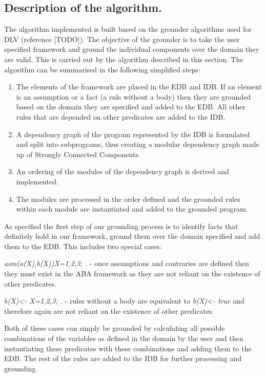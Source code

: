 \subsection{Description of the algorithm.}

The algorithm implemented is built based on the grounder algorithms used for DLV (reference [TODO]). The objective of the grounder is to take the user specified framework and ground the individual components over the domain they are valid. This is carried out by the algorithm described in this section. The algorithm can be summarised in the following simplified steps:

\begin{enumerate}
\item The elements of the framework are placed in the EDB and IDB. If an element is an assumption or a fact (a rule without a body) then they are grounded based on the domain they are specified and added to the EDB. All other rules that are depended on other predicates are added to the IDB.
\item A dependency graph of the program represented by the IDB is formulated and split into subprograms, thus creating a modular dependency graph made up of Strongly Connected Components.
\item An ordering of the modules of the dependency graph is derived and implemented.
\item The modules are processed in the order defined and the grounded rules within each module are instantiated and added to the grounded program.
\end{enumerate}

As specified the first step of our grounding process is to identify facts that definitely hold in our framework, ground them over the domain specified and add them to the EDB. This includes two special cases:

\begin{itemize*}
\item \emph{asm(a(X),b(X))\textbraceleft X=1,2,3; \textbraceright.} - once assumptions and contraries are defined then they must exist in the ABA framework as they are not reliant on the existence of other predicates.
\item \emph{b(X)\textless- \textbraceleft X=1,2,3; \textbraceright.} - rules without a body are equivalent to \emph{b(X)\textless- true} and therefore again are not reliant on the existence of other predicates.
\end{itemize*}

Both of these cases can simply be grounded by calculating all possible combinations of the variables as defined in the domain by the user and then instantiating these predicates with these combinations and adding them to the EDB. The rest of the rules are added to the IDB for further processing and grounding.

